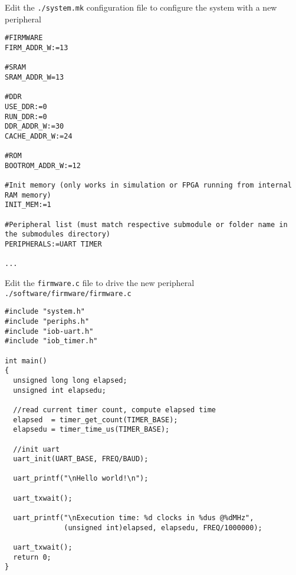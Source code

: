\documentclass [xcolor=svgnames, t] {beamer}
\begin{document}
\begin{frame}[fragile]{Edit the {\tt ./system.mk} configuration file to configure the system with a new peripheral}
\begin{tiny}
\begin{lstlisting}
#FIRMWARE
FIRM_ADDR_W:=13

#SRAM
SRAM_ADDR_W=13

#DDR
USE_DDR:=0
RUN_DDR:=0
DDR_ADDR_W:=30
CACHE_ADDR_W:=24

#ROM
BOOTROM_ADDR_W:=12

#Init memory (only works in simulation or FPGA running from internal RAM memory)
INIT_MEM:=1

#Peripheral list (must match respective submodule or folder name in the submodules directory)
PERIPHERALS:=UART TIMER

...
\end{lstlisting}
\end{tiny}
\end{frame}



\begin{frame}[fragile]{Edit the {\tt firmware.c} file to drive the new peripheral}
  {\tt ./software/firmware/firmware.c}
  \begin{tiny}
    \begin{lstlisting}
#include "system.h"
#include "periphs.h"
#include "iob-uart.h"
#include "iob_timer.h"

int main()
{
  unsigned long long elapsed;
  unsigned int elapsedu;

  //read current timer count, compute elapsed time
  elapsed  = timer_get_count(TIMER_BASE);
  elapsedu = timer_time_us(TIMER_BASE);

  //init uart 
  uart_init(UART_BASE, FREQ/BAUD);

  uart_printf("\nHello world!\n");
  
  uart_txwait();

  uart_printf("\nExecution time: %d clocks in %dus @%dMHz", 
              (unsigned int)elapsed, elapsedu, FREQ/1000000);

  uart_txwait();
  return 0;
}
\end{lstlisting}
\end{tiny}
\end{frame}
\end{document}
